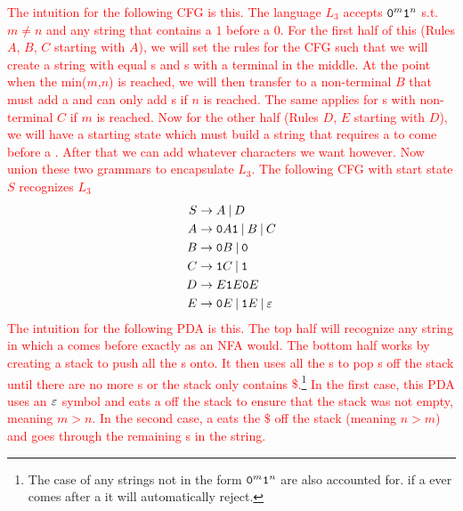 \textcolor{red}{
    The intuition for the following CFG is this. The language $L_3$ accepts $\texttt{0}^m\texttt{1}^n$ s.t. $m \neq n$ and any string that contains a $1$ before a $0$.
    For the first half of this (Rules $A$, $B$, $C$ starting with $A$), we will set the rules for the CFG such that we will create a string with equal s and s with a terminal in the middle. At the point when the min($m$,$n$) is reached, we will then transfer to a non-terminal $B$ that must add a  and can only add s if $n$ is reached. The same applies for s with non-terminal $C$ if $m$ is reached.
    Now for the other half (Rules $D$, $E$ starting with $D$), we will have a starting state which must build a string that requires a  to come before a . After that we can add whatever characters we want however.
    Now union these two grammars to encapsulate $L_3$. The following CFG with start state $S$ recognizes $L_3$
    \begin{align*}
    S & \rightarrow A \:|\: D \\
    A & \rightarrow \texttt{0}A\texttt{1} \:|\: B \:|\: C \\
    B & \rightarrow \texttt{0}B \:|\: \texttt{0} \\
    C & \rightarrow \texttt{1}C \:|\: \texttt{1} \\
    D & \rightarrow E\texttt{1}E\texttt{0}E\\
    E & \rightarrow \texttt{0}E \:|\: \texttt{1}E \:|\: \varepsilon \\
    \end{align*}
    The intuition for the following PDA is this. The top half will recognize any string in which a  comes before  exactly as an NFA would. The bottom half works by creating a stack to push all the s onto. It then uses all the s to pop s off the stack until there are no more s or the stack only contains $\$$.\footnote{The case of any strings not in the form $\texttt{0}^m\texttt{1}^n$ are also accounted for. if a  ever comes after a  it will automatically reject.} In the first case, this PDA uses an $\varepsilon$ symbol and eats a  off the stack to ensure that the stack was not empty, meaning $m > n$. In the second case, a  eats the $\$$ off the stack (meaning $n > m$) and goes through the remaining s in the string.
    \begin{figure}[h]
    \centering
\end{figure}}
